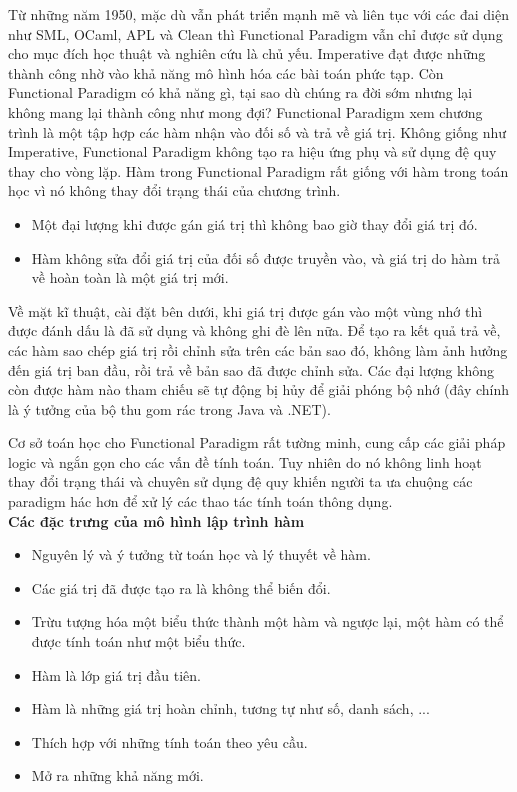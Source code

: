 \documentclass[10pt, a4paper]{article}
\begin{document}
Từ những năm 1950, mặc dù vẫn phát triển mạnh mẽ và liên tục với các đai diện như SML, OCaml, APL và Clean thì Functional Paradigm vẫn chỉ được sử dụng cho mục đích học thuật và nghiên cứu là chủ yếu. Imperative đạt được những thành công nhờ vào khả năng mô hình hóa các bài toán phức tạp. Còn Functional Paradigm có khả năng gì, tại sao dù chúng ra đời sớm nhưng lại không mang lại thành công như mong đợi?
Functional Paradigm xem chương trình là một tập hợp các hàm nhận vào đối số và trả về giá trị. Không giống như Imperative, Functional Paradigm không tạo ra hiệu ứng phụ và sử dụng đệ quy thay cho vòng lặp. Hàm trong Functional Paradigm rất giống với hàm trong toán học vì nó không thay đổi trạng thái của chương trình.

\begin{itemize}
\item Một đại lượng khi được gán giá trị thì không bao giờ thay đổi giá trị đó.
\item Hàm không sửa đổi giá trị của đối số được truyền vào, và giá trị do hàm trả về hoàn toàn là một giá trị mới.
\end{itemize}

Về mặt kĩ thuật, cài đặt bên dưới, khi giá trị được gán vào một vùng nhớ thì được đánh dấu là đã sử dụng và không ghi đè lên nữa. Để tạo ra kết quả trả về, các hàm sao chép giá trị rồi chỉnh sửa trên các bản sao đó, không làm ảnh hưởng đến giá trị ban đầu, rồi trả về bản sao đã được chỉnh sửa. Các đại lượng không còn được hàm nào tham chiếu sẽ tự động bị hủy để giải phóng bộ nhớ (đây chính là ý tưởng của bộ thu gom rác trong Java và .NET).

Cơ sở toán học cho Functional Paradigm rất tường minh, cung cấp các giải pháp logic và ngắn gọn cho các vấn đề tính toán. Tuy nhiên do nó không linh hoạt thay đổi trạng thái và chuyên sử dụng đệ quy khiến người ta ưa chuộng các paradigm hác hơn để xử lý các thao tác tính toán thông dụng.\\

\textbf{Các đặc trưng của mô hình lập trình hàm}
\begin{itemize}
\item Nguyên lý và ý tưởng từ toán học và lý thuyết về hàm.
\item Các giá trị đã được tạo ra là không thể biến đổi.
\item Trừu tượng hóa một biểu thức thành một hàm và ngược lại, một hàm có thể được tính toán như một biểu thức.
\item Hàm là lớp giá trị đầu tiên.
\item Hàm là những giá trị hoàn chỉnh, tương tự như số, danh sách, ...
\item Thích hợp với những tính toán theo yêu cầu.
\item Mở ra những khả năng mới.
\end{itemize}
\end{document}
